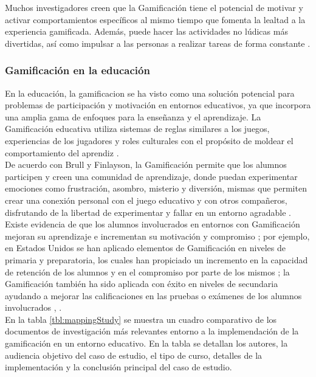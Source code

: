 \noindent Muchos investigadores creen que la Gamificación tiene el potencial de motivar y activar comportamientos específicos al mismo tiempo que fomenta la lealtad a la experiencia gamificada. Además, puede hacer las actividades no lúdicas más divertidas, así como impulsar a las personas a realizar tareas de forma constante \cite{Aldemir}.
\clearpage


\subsubsection{Gamificación en la educación}

En la educación, la \gls{gamificacion} se ha visto como una solución potencial para problemas de participación y motivación en entornos educativos, ya que incorpora una amplia gama de enfoques para la enseñanza y el aprendizaje. La Gamificación educativa utiliza sistemas de reglas similares a los juegos, experiencias de los jugadores y roles culturales con el propósito de moldear el comportamiento del aprendiz \cite{Aldemir}.\\
    
\noindent De acuerdo con Brull y Finlayson, la Gamificación permite que los alumnos participen y creen una comunidad de aprendizaje, donde puedan experimentar emociones como frustración, asombro, misterio y diversión, mismas que permiten crear una conexión personal con el juego educativo y con otros compañeros, disfrutando de la libertad de experimentar y fallar en un entorno agradable \cite{BrullFinlayson}.\\

\noindent Existe evidencia de que los alumnos involucrados en entornos con Gamificación mejoran su aprendizaje e incrementan su motivación y compromiso \cite{ChuHung}; por ejemplo, en Estados Unidos se han aplicado elementos de Gamificación en niveles de primaria y preparatoria, los cuales han propiciado un incremento en la capacidad de retención de los alumnos y en el compromiso por parte de los mismos \cite{BrullFinlayson}; la Gamificación también ha sido aplicada con éxito en niveles de secundaria ayudando a mejorar las calificaciones en las pruebas o exámenes de los alumnos involucrados \cite{UPIICSA}, \cite{Admiraal}.\\

\noindent En la tabla \ref{tbl:mappingStudy} se muestra un cuadro comparativo de los documentos de investigación más relevantes entorno a la implemendación de la gamificación en un entorno educativo. En la tabla se detallan los autores, la audiencia objetivo del caso de estudio, el tipo de curso, detalles de la implementación y la conclusión principal del caso de estudio.\\


